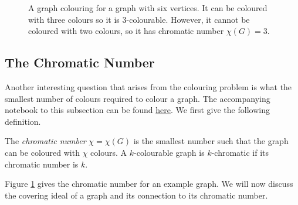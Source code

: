 \documentclass[../main.tex]{subfiles}
\begin{document}
    \begin{figure} [H]
        \centering
        \caption{A graph colouring for a graph with six vertices. It can be coloured with three colours so it is 3-colourable. However, it cannot be coloured with two colours, so it has chromatic number $\chi(G)=3$.}
 
        \label{fig:chromatic colour}
    \end{figure}



    \subsection{The Chromatic Number}

    Another interesting question that arises from the colouring problem is what the smallest number of colours required to colour a graph. The accompanying notebook to this subsection can be found \href{https://github.com/yangdabei/graph-colouring-and-sudoku/blob/main/example_chromatic_number.ipynb}{here}. We first give the following definition.

    \begin{definition}
        The \emph{chromatic number} $\chi=\chi(G)$ is the smallest number such that the graph can be coloured with $\chi$ colours. A $k$-colourable graph is $k$-chromatic if its chromatic number is $k$.
    \end{definition}
    Figure \ref{fig:chromatic colour} gives the chromatic number for an example graph. We will now discuss the covering ideal of a graph and its connection to its chromatic number.
\end{document}
